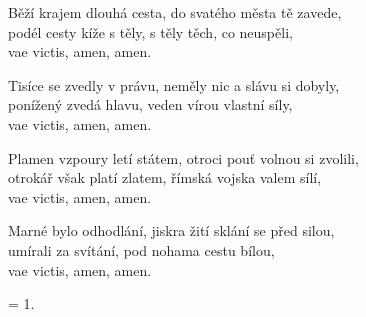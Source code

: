 
\ve{}
Běží krajem dlouhá cesta, do svatého města tě zavede,\\
podél cesty kíže s těly, s těly těch, co neuspěli,\\
vae victis, amen,  amen.

\ve{}
Tisíce se zvedly v právu, neměly nic a slávu si dobyly,\\
ponížený  zvedá hlavu, veden vírou vlastní síly,\\
vae  victis, amen, amen.

\ve{}
Plamen vzpoury letí státem, otroci pouť volnou si zvolili,\\
otrokář  však platí zlatem, římská vojska valem sílí,\\
vae  victis, amen, amen.

\ve{}
Marné bylo odhodlání, jiskra žití  sklání se před silou,\\
umírali za svítání, pod nohama cestu bílou,\\
vae victis, amen,  amen.
  
\ve{}
= 1.

\esong